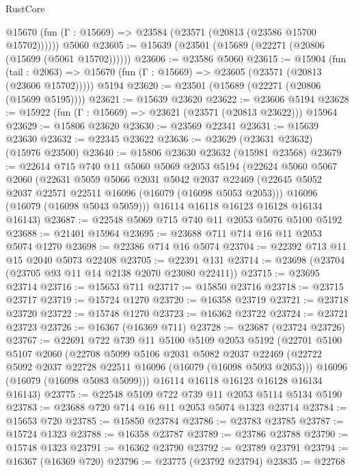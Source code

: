 \begin{lexlean}{RustCore}
\begin{coremodule}
      @15670 (fun (Γ : @15669) => @23584 (@23571 (@20813 (@23586 @15700 @15702))))))
    @5060
@23605 := @15639 (@23501 (@15689 (@22271 (@20806 (@15699 (@5061 @15702))))))
@23606 := @23586 @5060
@23615 := @15904
    (fun (tail : @2063) => @15670 (fun (Γ : @15669) => @23605 (@23571 (@20813 (@23606 @15702)))))
    @5194
@23620 := @23501 (@15689 (@22271 (@20806 (@15699 @5195))))
@23621 := @15639 @23620
@23622 := @23606 @5194
@23628 := @15922 (fun (Γ : @15669) => @23621 (@23571 (@20813 @23622))) @15964
@23629 := @15806 @23620
@23630 := @23569 @22341
@23631 := @15639 @23630
@23632 := @22345 @23622
@23636 := @23629 (@23631 @23632) (@15976 @23500)
@23640 := @15806 @23630 @23632 (@15981 @23568)
@23679 := @22614
    @715
    @740
    @11
    @5060
    @5069
    @2053
    @5194
    (@22624
      @5060
      @5067
      @2060
      (@22631
        @5059
        @5066
        @2031
        @5042
        @2037
        @22469
        (@22645 @5052 @2037 @22571 @22511 @16096 (@16079 (@16098 @5053 @2053)))
        @16096
        (@16079 (@16098 @5043 @5059)))
      @16114
      @16118
      @16123
      @16128
      @16134
      @16143)
@23687 := @22548 @5069 @715 @740 @11 @2053 @5076 @5100 @5192
@23688 := @21401 @15964
@23695 := @23688 @711 @714 @16 @11 @2053 @5074 @1270
@23698 := @22386 @714 @16 @5074
@23704 := @22392 @713 @11 @15 @2040 @5073 @22408
@23705 := @22391 @131
@23714 := @23698 (@23704 (@23705 @93 @11 @14 @2138 @2070 @23080 @22411))
@23715 := @23695 @23714
@23716 := @15653 @711
@23717 := @15850 @23716
@23718 := @23715 @23717
@23719 := @15724 @1270
@23720 := @16358 @23719
@23721 := @23718 @23720
@23722 := @15748 @1270
@23723 := @16362 @23722
@23724 := @23721 @23723
@23726 := @16367 (@16369 @711)
@23728 := @23687 (@23724 @23726)
@23767 := @22691
    @722
    @739
    @11
    @5100
    @5109
    @2053
    @5192
    (@22701
      @5100
      @5107
      @2060
      (@22708
        @5099
        @5106
        @2031
        @5082
        @2037
        @22469
        (@22722 @5092 @2037 @22728 @22511 @16096 (@16079 (@16098 @5093 @2053)))
        @16096
        (@16079 (@16098 @5083 @5099)))
      @16114
      @16118
      @16123
      @16128
      @16134
      @16143)
@23775 := @22548 @5109 @722 @739 @11 @2053 @5114 @5134 @5190
@23783 := @23688 @720 @714 @16 @11 @2053 @5074 @1323 @23714
@23784 := @15653 @720
@23785 := @15850 @23784
@23786 := @23783 @23785
@23787 := @15724 @1323
@23788 := @16358 @23787
@23789 := @23786 @23788
@23790 := @15748 @1323
@23791 := @16362 @23790
@23792 := @23789 @23791
@23794 := @16367 (@16369 @720)
@23796 := @23775 (@23792 @23794)
@23835 := @22768

\end{coremodule}
\end{lexlean}
